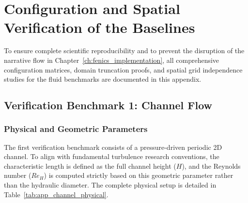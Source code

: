 \chapter{Configuration and Spatial Verification of the Baselines}
\label{app:baseline_configurations}

To ensure complete scientific reproducibility and to prevent the disruption of the narrative flow in Chapter~\ref{ch:fenics_implementation}, all comprehensive configuration matrices, domain truncation proofs, and spatial grid independence studies for the fluid benchmarks are documented in this appendix.

\section{Verification Benchmark 1: Channel Flow}
\label{sec:app_channel}

\subsection{Physical and Geometric Parameters}
\label{subsec:app_channel_physical}
The first verification benchmark consists of a pressure-driven periodic 2D channel. To align with fundamental turbulence research conventions, the characteristic length is defined as the full channel height ($H$), and the Reynolds number ($Re_H$) is computed strictly based on this geometric parameter rather than the hydraulic diameter. The complete physical setup is detailed in Table~\ref{tab:app_channel_physical}.

